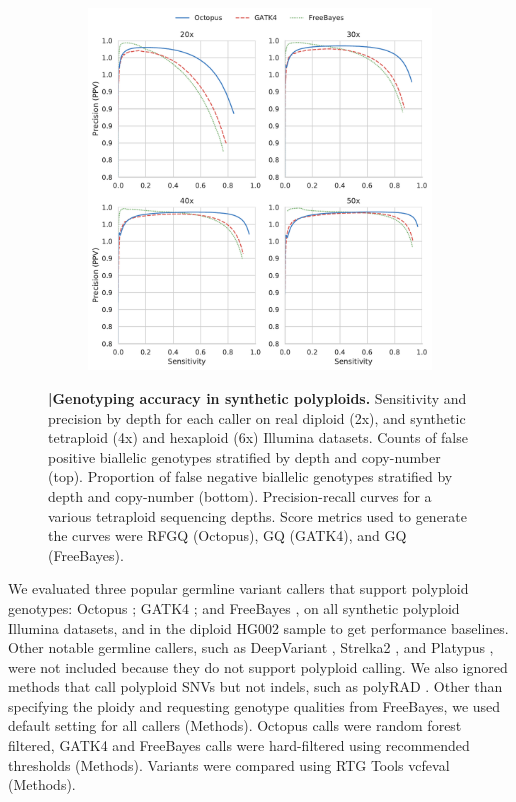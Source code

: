 \documentclass[notitlepage, twocolumn, 10pt]{article}
\begin{document}
\begin{figure}[ht!]
\begin{subfigure}[b]{0.4\textwidth}
        \includegraphics[height=\textwidth,width=\textwidth]{figures/synthetic-tetraploid-pr-curves_20-50x}
        \label{fig:synthetic:precision-recall}
    \end{subfigure}
    \vspace{-1cm}
    \caption{\textbf{|\:Genotyping accuracy in synthetic polyploids.} \protect{} Sensitivity and precision by depth for each caller on real diploid (2x), and synthetic tetraploid (4x) and hexaploid (6x) Illumina datasets. \protect{} Counts of false positive biallelic genotypes stratified by depth and copy-number (top). Proportion of false negative biallelic genotypes stratified by depth and copy-number (bottom). \protect{} Precision-recall curves for a various tetraploid sequencing depths. Score metrics used to generate the curves were RFGQ (Octopus), GQ (GATK4), and GQ (FreeBayes).}
    \label{fig:synthetic}
\end{figure}

We evaluated three popular germline variant callers that support polyploid genotypes: Octopus \cite{RN663}; GATK4 \cite{RN598}; and FreeBayes \cite{RN538}, on all synthetic polyploid Illumina datasets, and in the diploid HG002 sample to get performance baselines. Other notable germline callers, such as DeepVariant \cite{RN619}, Strelka2 \cite{RN604}, and Platypus \cite{RN5}, were not included because they do not support polyploid calling. We also ignored methods that  call polyploid SNVs but not indels, such as polyRAD \cite{RN662}. Other than specifying the ploidy and requesting genotype qualities from FreeBayes, we used default setting for all callers (Methods). Octopus calls were random forest filtered, GATK4 and FreeBayes calls were hard-filtered using recommended thresholds (Methods). Variants were compared using RTG Tools \cite{RN169} vcfeval (Methods).
\end{document}
